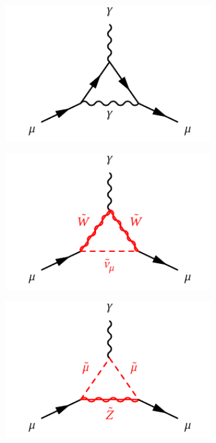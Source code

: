 \begin{figure}
	\centering
	\begin{subfigure}[b]{0.33\linewidth}
		\centering\includegraphics[width=1.0\textwidth]{qed_anomalous_moment}
		\caption{\label{fig:qed_anomalous_moment}}
	\end{subfigure}%
	\begin{subfigure}[b]{0.33\linewidth}
		\centering\includegraphics[width=1.0\textwidth]{susy_anomalous_moment_1}
		\caption{\label{fig:susy_anomalous_moment_1}}
	\end{subfigure}%
	\begin{subfigure}[b]{0.33\linewidth}
		\centering\includegraphics[width=1.0\textwidth]{susy_anomalous_moment_2}

\end{subfigure}
\end{figure}
